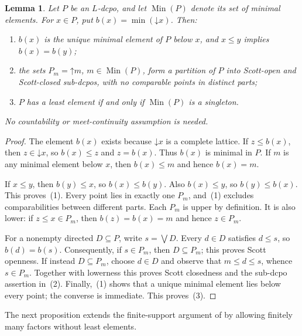 \documentclass[10pt,a4paper]{amsart}
\newtheorem{lemma}[theorem]{Lemma}
\numberwithin{equation}{section}
\newcommand{\down}[1]{\mathord{\downarrow}#1}
\newcommand{\up}[1]{\mathord{\uparrow}#1}
\begin{document}
\begin{lemma}\label{lem:minimal-component-decomposition}
Let $P$ be an $L$-dcpo, and let $\operatorname{Min}(P)$ denote its set of minimal elements. For $x\in P$, put $b(x)=\min(\down x)$. Then:
\begin{enumerate}[label=\textup{(\arabic*)}]
\item $b(x)$ is the unique minimal element of $P$ below $x$, and $x\le y$ implies $b(x)=b(y)$;
\item the sets $P_m=\up m$, $m\in\operatorname{Min}(P)$, form a partition of $P$ into Scott-open and Scott-closed sub-dcpos, with no comparable points in distinct parts;
\item $P$ has a least element if and only if $\operatorname{Min}(P)$ is a singleton.
\end{enumerate}
No countability or meet-continuity assumption is needed.
\end{lemma}
\begin{proof}
The element $b(x)$ exists because $\down x$ is a complete lattice. If $z\le b(x)$, then $z\in\down x$, so $b(x)\le z$ and $z=b(x)$. Thus $b(x)$ is minimal in $P$. If $m$ is any minimal element below $x$, then $b(x)\le m$ and hence $b(x)=m$.

If $x\le y$, then $b(y)\le x$, so $b(x)\le b(y)$. Also $b(x)\le y$, so $b(y)\le b(x)$. This proves~(1). Every point lies in exactly one $P_m$, and~(1) excludes comparabilities between different parts. Each $P_m$ is upper by definition. It is also lower: if $z\le x\in P_m$, then $b(z)=b(x)=m$ and hence $z\in P_m$.

For a nonempty directed $D\subseteq P$, write $s=\bigvee D$. Every $d\in D$ satisfies $d\le s$, so $b(d)=b(s)$. Consequently, if $s\in P_m$, then $D\subseteq P_m$; this proves Scott openness. If instead $D\subseteq P_m$, choose $d\in D$ and observe that $m\le d\le s$, whence $s\in P_m$. Together with lowerness this proves Scott closedness and the sub-dcpo assertion in~(2). Finally,~(1) shows that a unique minimal element lies below every point; the converse is immediate. This proves~(3).
\end{proof}

The next proposition extends the finite-support argument of \cite[Section~5]{XuJi} by allowing finitely many factors without least elements.
\end{document}
